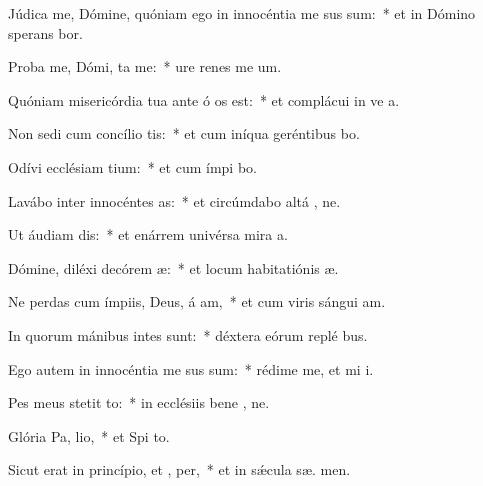 \item Júdica me, Dómine, quóniam ego in innocéntia me sus sum:~* et in Dómino sperans  bor.
\item Proba me, Dómi,  ta me:~* ure renes me   um.
\item Quóniam misericórdia tua ante ó os est:~* et complácui in ve a.
\item Non sedi cum concílio tis:~* et cum iníqua geréntibus  bo.
\item Odívi ecclésiam tium:~* et cum ímpi  bo.
\item Lavábo inter innocéntes  as:~* et circúmdabo altá , ne.
\item Ut áudiam  dis:~* et enárrem univérsa mira a.
\item Dómine, diléxi decórem  æ:~* et locum habitatiónis  æ.
\item Ne perdas cum ímpiis, Deus, á am,~* et cum viris sángui  am.
\item In quorum mánibus intes sunt:~* déxtera eórum replé  bus.
\item Ego autem in innocéntia me sus sum:~* rédime me, et mi i.
\item Pes meus stetit  to:~* in ecclésiis bene , ne.
\item Glória Pa,  lio,~* et Spi to.
\item Sicut erat in princípio, et ,  per,~* et in sǽcula sæ. men.
